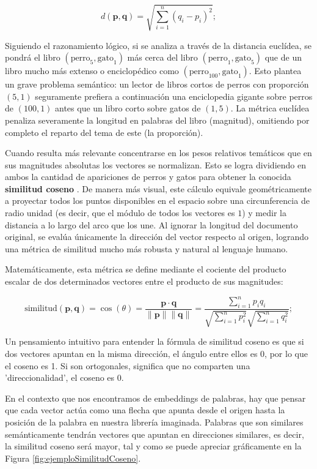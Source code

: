 \[
  d(\mathbf{p}, \mathbf{q}) = \sqrt{\sum_{i=1}^{n} (q_i - p_i)^2};
\]

Siguiendo el razonamiento lógico, si se analiza a través de la distancia euclídea, se pondrá el libro $(\text{perro}_5, \text{gato}_1)$ más cerca del libro $(\text{perro}_1, \text{gato}_5)$ que de un libro mucho más extenso o enciclopédico como $(\text{perro}_{100}, \text{gato}_1)$. Esto plantea un grave problema semántico: un lector de libros cortos de perros con proporción $(5, 1)$ seguramente prefiera a continuación una enciclopedia gigante sobre perros de $(100, 1)$ antes que un libro corto sobre gatos de $(1, 5)$. La métrica euclídea penaliza severamente la longitud en palabras del libro (magnitud), omitiendo por completo el reparto del tema de este (la proporción).

Cuando resulta más relevante concentrarse en los pesos relativos temáticos que en sus magnitudes absolutas los vectores se normalizan. Esto se logra dividiendo en ambos la cantidad de apariciones de perros y gatos para obtener la conocida \textbf{similitud coseno} \cite{porter_understanding_2023}. De manera más visual, este cálculo equivale geométricamente a proyectar todos los puntos disponibles en el espacio sobre una circunferencia de radio unidad (es decir, que el módulo de todos los vectores es $1$) y medir la distancia a lo largo del arco que los une. Al ignorar la longitud del documento original, se evalúa únicamente la dirección del vector respecto al origen, logrando una métrica de similitud mucho más robusta y natural al lenguaje humano.

Matemáticamente, esta métrica se define mediante el cociente del producto escalar de dos determinados vectores entre el producto de sus magnitudes:

\[
  \text{similitud}(\mathbf{p}, \mathbf{q}) = \cos(\theta) = \frac{\mathbf{p} \cdot \mathbf{q}}{\|\mathbf{p}\| \|\mathbf{q}\|} = \frac{\sum_{i=1}^{n} p_i q_i}{\sqrt{\sum_{i=1}^{n} p_i^2} \sqrt{\sum_{i=1}^{n} q_i^2}};
\]

Un pensamiento intuitivo para entender la fórmula de similitud coseno es que si dos vectores apuntan en la misma dirección, el ángulo entre ellos es 0, por lo que el coseno es 1. Si son ortogonales, significa que no comparten una 'direccionalidad', el coseno es 0.

En el contexto que nos encontramos de embeddings de palabras, hay que pensar que cada vector actúa como una flecha que apunta desde el origen hasta la posición de la palabra en nuestra librería imaginada. Palabras que son similares semánticamente tendrán vectores que apuntan en direcciones similares, es decir, la similitud coseno será mayor, tal y como se puede apreciar gráficamente en la Figura \ref{fig:ejemploSimilitudCoseno}.

